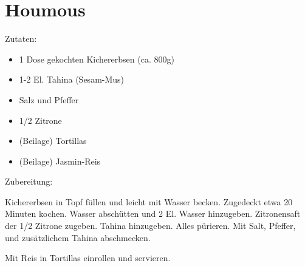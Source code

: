 \section{Houmous}
Zutaten:
\begin{itemize}
    \item 1 Dose gekochten Kichererbsen (ca. 800g)
    \item 1-2 El. Tahina (Sesam-Mus)
    \item Salz und Pfeffer
    \item 1/2 Zitrone
    \item (Beilage) Tortillas
    \item (Beilage) Jasmin-Reis
\end{itemize}


Zubereitung:

Kichererbsen in Topf füllen und leicht mit Wasser becken. Zugedeckt etwa 20 Minuten kochen. Wasser abschütten und 2 El. Wasser hinzugeben. Zitronensaft der 1/2 Zitrone zugeben. Tahina hinzugeben. Alles pürieren. Mit Salt, Pfeffer, und zusätzlichem Tahina abschmecken.

Mit Reis in Tortillas einrollen und servieren.

\newpage
\mbox{}
\vfill
\begin{center}
\end{center}
\vfill
\mbox{ }
\newpage
